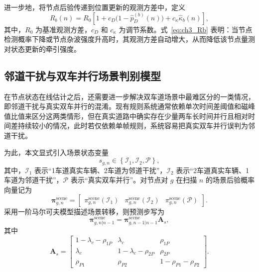 \documentclass{xdupgthesis}
\begin{document}
进一步地，将节点后验传递到位置更新的观测方差中，定义
\begin{equation}
	R_b(n)=R_0\left[1+c_D\bigl(1-\hat p_D^{(b)}(n)\bigr)+c_{\kappa}\hat\kappa_b(n)\right],
	\label{eq:ch3_Rb}
\end{equation}
其中，$R_0$ 为基准观测方差，$c_D$ 和 $c_{\kappa}$ 为调节系数。式~\eqref{eq:ch3_Rb} 表明：当节点检测概率下降或节点杂波强度升高时，其观测方差自动增大，从而降低该节点量测对状态更新的牵引强度。

\subsection{邻道干扰与双车并行场景判别模型}

在节点状态在线估计之后，还需要进一步解决双车道场景中最难区分的一类情况，即邻道干扰与真实双车并行的混淆。现有规则系统通常依赖单次时间差阈值和磁峰值比值来区分这两类情形，但在真实道路中确实存在少量两车长时间并行且相对时间差持续较小的情况，此时若仅依赖单帧规则，系统容易把真实双车并行误判为邻道干扰。

为此，本文显式引入场景状态变量
\begin{equation}
	s_{g,n}\in\left\{\mathcal I_1,\mathcal I_2,\mathcal P\right\},
	\label{eq:ch3_scene_state}
\end{equation}
其中，$\mathcal I_1$ 表示“1车道真实车辆、2车道为邻道干扰”，$\mathcal I_2$ 表示“2车道真实车辆、1车道为邻道干扰”，$\mathcal P$ 表示“真实双车并行”。对节点对 $g$ 在扫描 $n$ 的场景后验概率向量记为
\begin{equation}
	\boldsymbol\pi_{g,n}^{\mathrm{scene}}=
	\begin{bmatrix}
		\pi_{g,n}^{\mathrm{scene}}(\mathcal I_1) &
		\pi_{g,n}^{\mathrm{scene}}(\mathcal I_2) &
		\pi_{g,n}^{\mathrm{scene}}(\mathcal P)
	\end{bmatrix}.
	\label{eq:ch3_scene_vector}
\end{equation}
采用一阶马尔可夫模型描述场景转移，则预测步写为
\begin{equation}
	\boldsymbol\pi_{g,n|n-1}^{\mathrm{scene}}=
	\boldsymbol\pi_{g,n-1|n-1}^{\mathrm{scene}}\mathbf A_s,
	\label{eq:ch3_scene_predict}
\end{equation}
其中
\begin{equation}
	\mathbf A_s=
	\begin{bmatrix}
		1-\lambda_c-\rho_{1P} & \lambda_c & \rho_{1P}\\
		\lambda_c & 1-\lambda_c-\rho_{2P} & \rho_{2P}\\
		\rho_{P1} & \rho_{P2} & 1-\rho_{P1}-\rho_{P2}
	\end{bmatrix}.
	\label{eq:ch3_As}
\end{equation}
\end{document}
